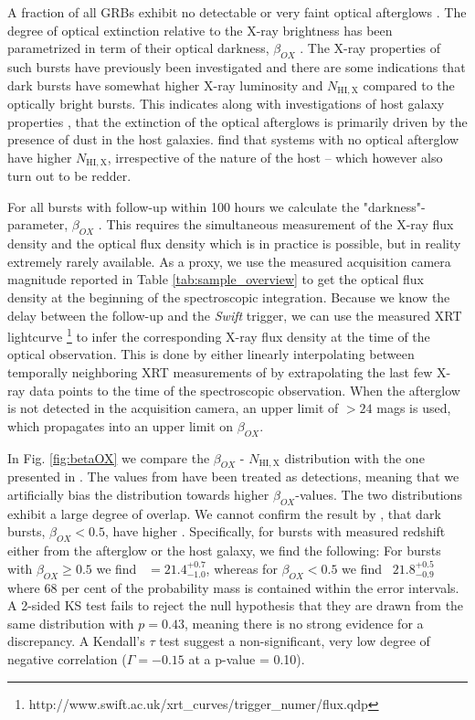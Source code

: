 \documentclass{aa}    %
\begin{document}
A fraction of all GRBs exhibit no detectable or very faint optical afterglows
\citep{Groot1998, Djorgovski2001, Fynbo2001}. The degree of optical extinction
relative to the X-ray brightness has been parametrized in term of their optical
darkness, $\beta_{OX}$ \citep{Jakobsson2004, Rol2005, VanderHorst2009}. The
X-ray properties of such bursts have previously been investigated
\citep{DePasquale2003, Fynbo2009, Melandri2012} and there are some indications
that dark bursts have somewhat higher X-ray luminosity and $N_{\mathrm{HI, X}}$
compared to the optically bright bursts. This indicates along with
investigations of host galaxy properties \citep{Greiner2011, Kruhler2011,
	Hjorth2012, Perley2016b}, that the extinction of the optical afterglows is
primarily driven by the presence of dust in the host galaxies. \citet{Hjorth2012}
find that systems with no optical afterglow have higher $N_{\mathrm{HI, X}}$,
irrespective of the nature of the host -- which however also turn out to be
redder.

For all bursts with follow-up within 100 hours we calculate the
"darkness"-parameter, $\beta_{OX}$ \citep{Jakobsson2004}. This requires the
simultaneous measurement of the X-ray flux density and the optical flux density
which is in practice is possible, but in reality extremely rarely available. As
a proxy, we use the measured acquisition camera magnitude reported in Table
\ref{tab:sample_overview} to get the optical flux density at the beginning of
the spectroscopic integration. Because we know the delay between the follow-up
and the \textit{Swift} trigger, we can use the measured XRT lightcurve
\citep{Evans2007,
	Evans2009}\footnote{http://www.swift.ac.uk/xrt\_curves/trigger\_numer/flux.qdp}
to infer the corresponding X-ray flux density at the time of the optical
observation. This is done by either linearly interpolating between temporally
neighboring XRT measurements of by extrapolating the last few X-ray data points
to the time of the spectroscopic observation. When the afterglow is not detected
in the acquisition camera, an upper limit of $> 24$ mags is used, which
propagates into an upper limit on $\beta_{OX}$.

In Fig. \ref{fig:betaOX} we compare the $\beta_{OX}$ - $N_{\mathrm{HI, X}}$
distribution with the one presented in \citet{Fynbo2009}. The values from
\citet{Fynbo2009} have been treated as detections, meaning that we artificially
bias the distribution towards higher $\beta_{OX}$-values. The two distributions
exhibit a large degree of overlap. We cannot confirm the result by
\citet{Fynbo2009}, that dark bursts, $\beta_{OX} < 0.5$, have higher \nhx.
Specifically, for bursts with measured redshift either from the afterglow or the
host galaxy, we find the following: For bursts with $\beta_{OX} \geq 0.5$ we
find \nhx~$ = 21.4_{-1.0}^{+0.7}$, whereas for $\beta_{OX} < 0.5$ we find
\nhx~$21.8_{-0.9}^{+0.5}$ where 68 per cent of the probability mass is contained
within the error intervals. A 2-sided KS test fails to reject the null
hypothesis that they are drawn from the same distribution with $p = 0.43$,
meaning there is no strong evidence for a discrepancy. A Kendall's $\tau$ test
suggest a non-significant, very low degree of negative correlation ($\Gamma =
-0.15$ at a p-value = 0.10).
\end{document}
